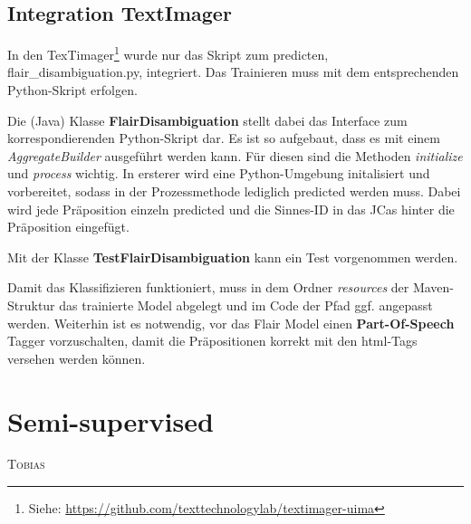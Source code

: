 \documentclass[10pt,a4paper]{article}
\newcommand{\chapterauthor}[1]{%
	{\parindent0pt\vspace*{-5pt}\hspace*{\fill}%
  \linespread{1.1}\large\scshape#1%
  \par\nobreak\vspace*{10pt}}
}
\begin{document}
\subsection{Integration TextImager}
\begin{flushleft}
In den TexTimager\footnote{Siehe: \url{https://github.com/texttechnologylab/textimager-uima}} wurde nur das Skript zum predicten, flair\_disambiguation.py, integriert. Das Trainieren muss mit dem entsprechenden Python-Skript erfolgen.

Die (Java) Klasse \textbf{FlairDisambiguation} stellt dabei das Interface zum korrespondierenden Python-Skript dar. Es ist so aufgebaut, dass es mit einem \textit{AggregateBuilder} ausgeführt werden kann. Für diesen sind die Methoden \textit{initialize} und \textit{process} wichtig. In ersterer wird eine Python-Umgebung initalisiert und vorbereitet, sodass in der Prozessmethode lediglich predicted werden muss. Dabei wird jede Präposition einzeln predicted und die Sinnes-ID in das JCas hinter die Präposition eingefügt.

Mit der Klasse \textbf{TestFlairDisambiguation} kann ein Test vorgenommen werden.

Damit das Klassifizieren funktioniert, muss in dem Ordner \textit{resources} der Maven-Struktur das trainierte Model abgelegt und im Code der Pfad ggf. angepasst werden. Weiterhin ist es notwendig, vor das Flair Model einen \textbf{Part-Of-Speech} Tagger vorzuschalten, damit die Präpositionen korrekt mit den html-Tags versehen werden können.
\end{flushleft}

\newpage

\section{Semi-supervised}
\chapterauthor{Tobias}
\end{document}
